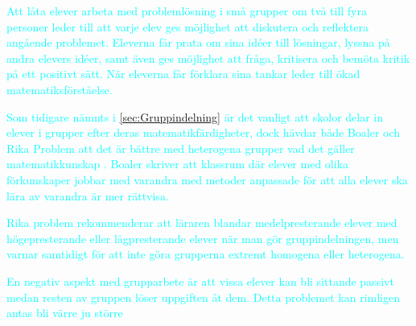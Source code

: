 \textcolor{cyan} {
Att låta elever arbeta med problemlösning i små grupper om två till fyra personer leder till att varje elev ges möjlighet att diskutera och reflektera angående problemet. Eleverna får prata om sina idéer till lösningar, lyssna på andra elevers idéer, samt även ges möjlighet att fråga, kritisera och bemöta kritik på ett positivt sätt. När eleverna får förklara sina tankar leder till ökad matematiksförståelse. \cite{RikaProblem}
}

\textcolor{cyan} {
Som tidigare nämnts i \ref{sec:Gruppindelning} är det vanligt att skolor delar in elever i grupper efter deras matematikfärdigheter, dock hävdar både Boaler och Rika Problem att det är bättre med heterogena grupper vad det gäller matematikkunskap \cite{TheElephant}\cite{RikaProblem}. Boaler skriver att klassrum där elever med olika förkunskaper jobbar med varandra med metoder anpassade för att alla elever ska lära av varandra är mer rättvisa\cite{TheElephant}. 
}

\textcolor{cyan} {
Rika problem rekommenderar att läraren blandar medelpresterande elever med högepresterande eller lågpresterande elever när man gör gruppindelningen, men varnar samtidigt för att inte göra grupperna extremt homogena eller heterogena\cite{RikaProblem}.
}




\textcolor{cyan} {
En negativ aspekt med grupparbete är att vissa elever kan bli sittande passivt medan resten av gruppen löser uppgiften åt dem\cite{RikaProblem}. Detta problemet kan rimligen antas bli värre ju större 
}











